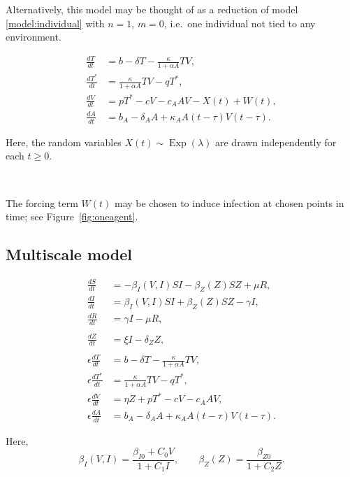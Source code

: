 \documentclass[11pt]{article}
\numberwithin{equation}{subsection}
\begin{document}
    Alternatively, this model may be thought of as a reduction of model
    \ref{model:individual} with $n = 1$, $m = 0$, i.e.\ one individual not
    tied to any environment.

    \begin{align}
        \frac{dT}{dt} &= b -  \delta T - \frac{\kappa}{1 + \alpha A} TV, \\
        \frac{dT^*}{dt} &= \frac{\kappa}{1 + \alpha A} TV - qT^*, \\
        \frac{dV}{dt} &= pT^* - cV - c_A AV - X(t) + W(t), \\
        \frac{dA}{dt} &= b_A -  \delta_A A + \kappa_A A(t - \tau)V(t - \tau).
    \end{align}

    Here, the random variables $X(t) \sim \operatorname{Exp}(\lambda)$ are
    drawn independently for each $t \geq 0$.

    ~

    The forcing term $W(t)$ may be chosen to induce infection at chosen points
    in time; see Figure~\ref{fig:oneagent}.


    \subsection{Multiscale model} \label{model:multiscale}

    \begin{align}
        \frac{dS}{dt} &= -\beta_I(V, I) SI - \beta_Z(Z) SZ + \mu R, \\
        \frac{dI}{dt} &= \beta_I(V, I) SI + \beta_Z(Z) SZ - \gamma I, \\
        \frac{dR}{dt} &= \gamma I - \mu R, \\\\
        \frac{dZ}{dt} &= \xi I - \delta_Z Z, \\\\
        \epsilon \frac{dT}{dt} &= b -  \delta T - \frac{\kappa}{1 + \alpha A} TV, \\
        \epsilon \frac{dT^*}{dt} &= \frac{\kappa}{1 + \alpha A} TV - qT^*, \\
        \epsilon \frac{dV}{dt} &= \eta Z + pT^* - cV - c_A AV, \\
        \epsilon \frac{dA}{dt} &= b_A -  \delta_A A + \kappa_A A(t - \tau)V(t - \tau).
    \end{align}

    Here, \[
        \beta_I(V, I) = \frac{\beta_{I0} + C_0 V}{1 + C_1 I}, \qquad
        \beta_Z(Z) = \frac{\beta_{Z0}}{1 + C_2 Z}.
    \]
\end{document}
